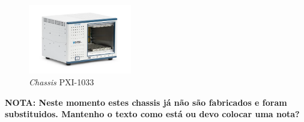 \begin{figure}[hbtp]
    \centering
    \includegraphics[width=0.4\textwidth]{figures/PXI-1033.png}
    \caption{\textit{Chassis} PXI-1033 \cite{PXI-1033}}
    \label{fig:PXI-1033}
\end{figure}

\textbf{NOTA: Neste momento estes chassis já não são fabricados e foram substituidos. Mantenho o texto como está ou devo colocar uma nota?}

